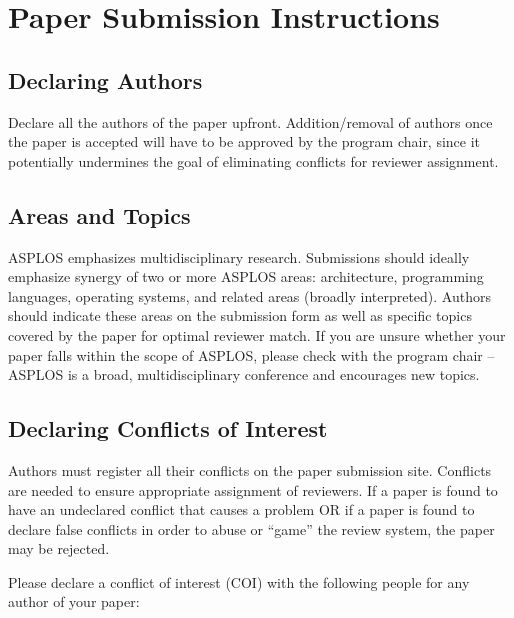 \documentclass[pageno]{jpaper}
\begin{document}
\section{Paper Submission Instructions}

\subsection{Declaring Authors}

Declare all the authors of the paper upfront. Addition/removal of authors
once the paper is accepted will have to be approved by the program chair,
since it potentially undermines the goal of eliminating conflicts for
reviewer assignment.

\subsection{Areas and Topics}

ASPLOS emphasizes multidisciplinary research. Submissions should ideally
emphasize synergy of two or more ASPLOS areas: architecture, programming
languages, operating systems, and related areas (broadly
interpreted). Authors should indicate these areas on the submission form as
well as specific topics covered by the paper for optimal reviewer match. If
you are unsure whether your paper falls within the scope of ASPLOS, please
check with the program chair -- ASPLOS is a broad, multidisciplinary
conference and encourages new topics.

\subsection{Declaring Conflicts of Interest}

Authors must register all their conflicts on the paper submission site.
Conflicts are needed to ensure appropriate assignment of reviewers.  
If a paper is found to have an undeclared conflict that causes
a problem OR if a paper is found to declare false conflicts in order to
abuse or ``game'' the review system, the paper may be rejected.

Please declare a conflict of interest (COI) with the following people 
for any author of your paper:
\end{document}
